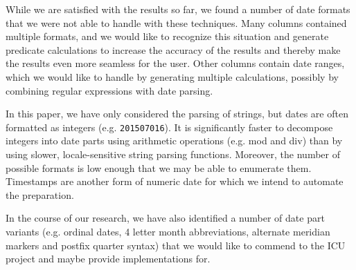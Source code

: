 While we are satisfied with the results so far, we found a number of date formats that we were not able to handle with these techniques. Many columns contained multiple formats, and we would like to recognize this situation and generate predicate calculations to increase the accuracy of the results and thereby make the results even more seamless for the user. Other columns contain date ranges, which we would like to handle by generating multiple calculations, possibly by combining regular expressions with date parsing.

In this paper, we have only considered the parsing of strings, but dates are often formatted as integers (e.g. \texttt{201507016}). It is significantly faster to decompose integers into date parts using arithmetic operations (e.g. mod and div) than by using slower, locale-sensitive string parsing functions. Moreover, the number of possible formats is low enough that we may be able to enumerate them. Timestamps are another form of numeric date for which we intend to automate the preparation.

In the course of our research, we have also identified a number of date part variants (e.g. ordinal dates, 4 letter month abbreviations, alternate meridian markers and postfix quarter syntax) that we would like to commend to the ICU project and maybe provide implementations for.
